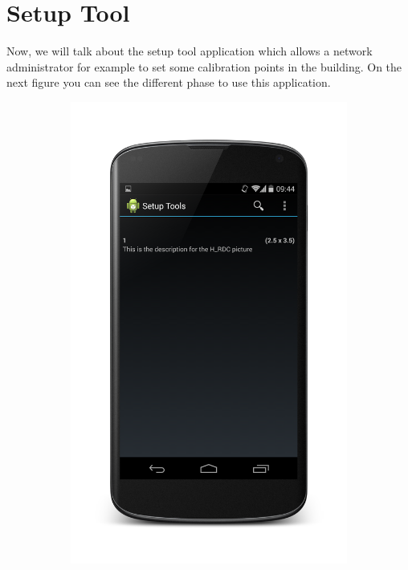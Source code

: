 \section{Setup Tool}
Now, we will talk about the setup tool application which allows a network administrator for example to set some calibration points in the building. On the next figure you can see the different phase to use this application.


\begin{figure}[h]
        \centering
        \begin{subfigure}[b]{0.3\textwidth}
    			\includegraphics[scale=0.1]{./android/Setup_list.png}

\end{subfigure}
\end{figure}
